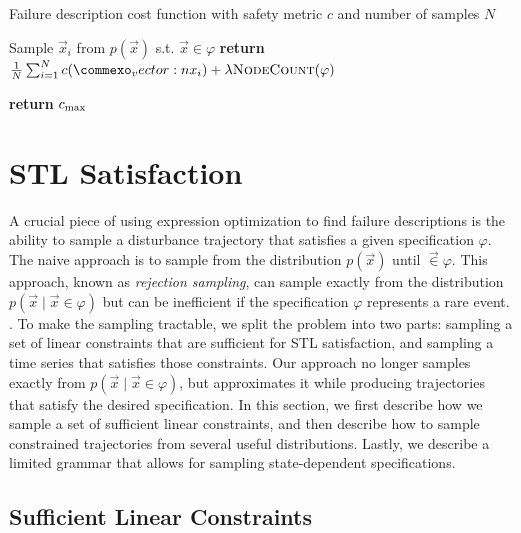 \begin{algorithm}
\caption{Failure description cost function with safety metric $c$ and number of samples $N$} \label{alg:failure_description_cost_function}
\begin{algorithmic}[1]
     \label{line:fdcost_is_satisfiable}
            \State Sample $\vec{x}_i$ from $p(\vec{x})$ s.t. $\vec{x} \in \varphi$ \label{line:fdcost_sample_disturbance_trajectory}
        \EndFor
        \State \textbf{return} $\frac{1}{N} \sum_{i=1}^N  c(\vec{x}_i) + \lambda \textproc{NodeCount}(\varphi)$ \label{line:fdcost_compute_avg}
        
    \Else
        \State \textbf{return} $c_{\rm max}$ \label{line:fdcost_return_max_cost}
    \EndIf
    \EndFunction
\end{algorithmic}
\end{algorithm}


\section{STL Satisfaction}
A crucial piece of using expression optimization to find failure descriptions is the ability to sample a disturbance trajectory that satisfies a given specification $\varphi$. The naive approach is to sample from the distribution $p(\vec{x})$ until $\vec \in \varphi$. This approach, known as \emph{rejection sampling}, can sample exactly from the distribution $p(\vec{x} \mid \vec{x} \in \varphi)$ but can be inefficient if the specification $\varphi$ represents a rare event. . To make the sampling tractable, we split the problem into two parts: sampling a set of linear constraints that are sufficient for STL satisfaction, and sampling a time series that satisfies those constraints. Our approach no longer samples exactly from $p(\vec{x} \mid \vec{x} \in \varphi)$, but approximates it while producing trajectories that satisfy the desired specification. In this section, we first describe how we sample a set of sufficient linear constraints, and then describe how to sample constrained trajectories from several useful distributions. Lastly, we describe a limited grammar that allows for sampling state-dependent specifications. 

\subsection{Sufficient Linear Constraints}

